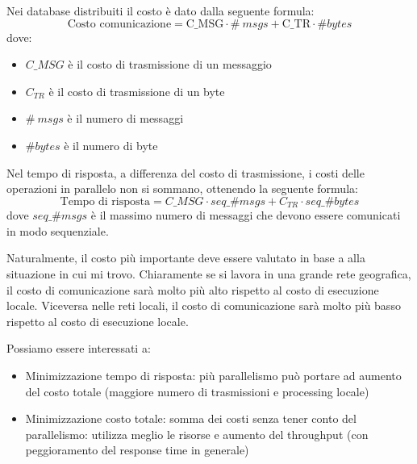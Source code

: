 Nei database distribuiti il costo è dato dalla seguente formula:
\begin{equation*}
    \text{Costo comunicazione} = \text{C\_{MSG}} \cdot \#\ msgs  + \text{C\_{TR}} \cdot \#bytes
\end{equation*}
dove:
\begin{itemize}
    \item \textbf{$C\_{MSG}$} è il costo di trasmissione di un messaggio
    \item \textbf{$C_{TR}$} è il costo di trasmissione di un byte
    \item \textbf{$\#\ msgs$} è il numero di messaggi
    \item \textbf{$\#bytes$} è il numero di byte
\end{itemize}
Nel tempo di risposta, a differenza del costo di trasmissione, i costi delle
operazioni in parallelo non si sommano, ottenendo la seguente formula:
\begin{equation*}
    \text{Tempo di risposta} = C\_{MSG} \cdot seq\_\#msgs + C_{TR} \cdot seq\_\#bytes
\end{equation*}
dove $seq\_\#msgs$ è il massimo numero di messaggi che devono essere comunicati
in modo sequenziale.

Naturalmente, il costo più importante deve essere valutato in base a alla
situazione in cui mi trovo. Chiaramente se si lavora in una grande rete
geografica, il costo di comunicazione sarà molto più alto rispetto al costo di
esecuzione locale. Viceversa nelle reti locali, il costo di comunicazione sarà
molto più basso rispetto al costo di esecuzione locale.

Possiamo essere interessati a:
\begin{itemize}
    \item Minimizzazione tempo di risposta: più parallelismo può portare ad
          aumento del costo totale (maggiore numero di trasmissioni e
          processing locale)
    \item Minimizzazione costo totale: somma dei costi senza tener conto del
          parallelismo: utilizza meglio le risorse e aumento del throughput (con
          peggioramento del response time in generale)
\end{itemize}
